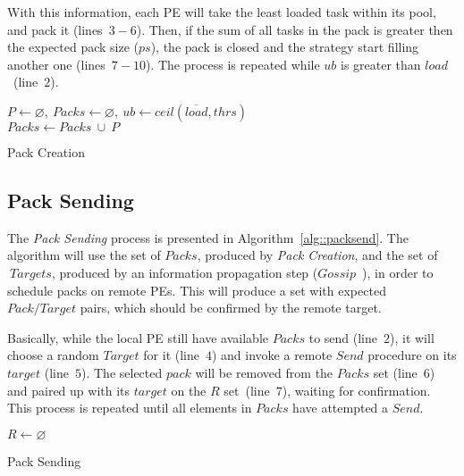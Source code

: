 With this information, each PE will take the least loaded task within its pool, and pack it (lines~$3-6$).
Then, if the sum of all tasks in the pack is greater then the expected pack size ($ps$), the pack is closed and the strategy start filling another one (lines~$7-10$).
The process is repeated while $ub$ is greater than $load$~(line~$2$).

\begin{algorithm}[!ht]
    \DontPrintSemicolon
    $P \gets \varnothing,\ Packs \gets \varnothing,\ ub \gets ceil(\overline{load},thrs)$ \\
    $Packs \gets Packs\ \cup\ P$   
    \caption{Pack Creation} 
    \label{alg::packcreation}
\end{algorithm}

\subsection{Pack Sending}

The \textit{Pack Sending} process is presented in Algorithm~\ref{alg::packsend}.
The algorithm will use the set of $Packs$, produced by \textit{Pack Creation}, and the set of $\ Targets$, produced by an information propagation step ($Gossip$~\cite{gossip}), in order to schedule packs on remote PEs.
This will produce a set with expected $Pack/Target$ pairs, which should be confirmed by the remote target.

Basically, while the local PE still have available $Packs$ to send (line~$2$), it will choose a random $Target$ for it (line~$4$) and invoke a remote $Send$ procedure on its $target$ (line~$5$).
The selected $pack$ will be removed from the $Packs$ set (line~$6$) and paired up with its $target$ on the $R$ set~(line~$7$), waiting for confirmation.
This process is repeated until all elements in $Packs$ have attempted a $Send$.

\begin{algorithm}[!ht]
    \DontPrintSemicolon
    $R \gets \varnothing$ \\
    \caption{Pack Sending}  
    \label{alg::packsend}
\end{algorithm}

